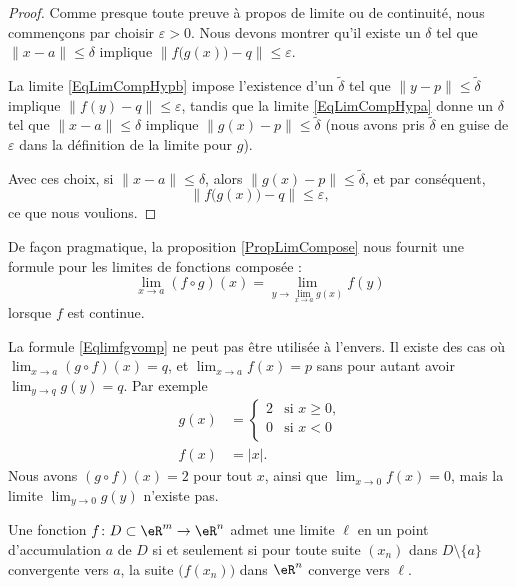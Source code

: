 \begin{proof}
	Comme presque toute preuve à propos de limite ou de continuité, nous commençons par choisir $\varepsilon>0$. Nous devons montrer qu'il existe un $\delta$ tel que $\| x-a \|\leq \delta$ implique $\| f\big( g(x) \big)-q \|\leq \varepsilon$.

	La limite \eqref{EqLimCompHypb} impose l'existence d'un $\tilde\delta$ tel que $\| y-p \|\leq\tilde\delta$ implique $\| f(y)-q \|\leq\varepsilon$, tandis que la limite \eqref{EqLimCompHypa} donne un $\delta$ tel que $\| x-a \|\leq\delta$ implique $\| g(x)-p \|\leq\tilde\delta$ (nous avons pris $\tilde\delta$ en guise de $\varepsilon$ dans la définition de la limite pour $g$).

	Avec ces choix, si $\| x-a \|\leq \delta$, alors $\| g(x)-p \|\leq\tilde\delta$, et par conséquent,
	\begin{equation}
		\| f\big( g(x) \big)-q \|\leq\varepsilon,
	\end{equation}
	ce que nous voulions.
\end{proof}

De façon pragmatique, la proposition \ref{PropLimCompose} nous fournit une formule pour les limites de fonctions composée :
\begin{equation}		\label{Eqlimfgvomp}
	\lim_{x\to a} (f\circ g)(x)=\lim_{y\to \lim_{x\to a} g(x)}f(y)
\end{equation}
lorsque $f$ est continue.

\begin{remark}
	La formule \eqref{Eqlimfgvomp} ne peut pas être utilisée à l'envers. Il existe des cas où $\lim_{x\to a} (g\circ f)(x)=q$, et $\lim_{x\to a} f(x)=p$ sans pour autant avoir $\lim_{y\to q} g(y)=q$. Par exemple
	\begin{subequations}
		\begin{align}
			g(x)&=\begin{cases}
				2	&	\text{si $x\geq0$,}\\
				0	&	 \text{si $x<0$}\\
			\end{cases}\\
			f(x)&=| x |.
		\end{align}
	\end{subequations}
	Nous avons $(g\circ f)(x)=2$ pour tout $x$, ainsi que $\lim_{x\to 0} f(x)=0$, mais la limite $\lim_{y\to 0} g(y)$ n'existe pas.
\end{remark}


\begin{theorem}		\label{ThoLimSuite}
	Une fonction $f\colon D\subset\eR^m\to \eR^n$ admet une limite $\ell$ en un point d'accumulation $a$ de $D$ si et seulement si pour toute suite $(x_n)$ dans $D\setminus\{ a \}$ convergente vers $a$, la suite $\big( f(x_n) \big)$ dans $\eR^n$ converge vers $\ell$.
\end{theorem}

